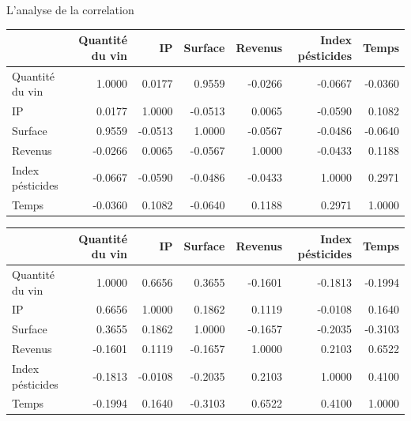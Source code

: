 \documentclass[11pt,ignorenonframetext,]{beamer}
\begin{document}
\begin{frame}{L'analyse de la correlation}
\protect\hypertarget{lanalyse-de-la-correlation}{}

\tiny

\normalsize

\tiny

\begin{longtable}[]{@{}lrrrrrr@{}}
\toprule
& Quantité du vin & IP & Surface & Revenus & Index pésticides &
Temps\tabularnewline
\midrule
\endhead
Quantité du vin & 1.0000 & 0.0177 & 0.9559 & -0.0266 & -0.0667 &
-0.0360\tabularnewline
IP & 0.0177 & 1.0000 & -0.0513 & 0.0065 & -0.0590 &
0.1082\tabularnewline
Surface & 0.9559 & -0.0513 & 1.0000 & -0.0567 & -0.0486 &
-0.0640\tabularnewline
Revenus & -0.0266 & 0.0065 & -0.0567 & 1.0000 & -0.0433 &
0.1188\tabularnewline
Index pésticides & -0.0667 & -0.0590 & -0.0486 & -0.0433 & 1.0000 &
0.2971\tabularnewline
Temps & -0.0360 & 0.1082 & -0.0640 & 0.1188 & 0.2971 &
1.0000\tabularnewline
\bottomrule
\end{longtable}

\normalsize

\tiny

\begin{longtable}[]{@{}lrrrrrr@{}}
\toprule
& Quantité du vin & IP & Surface & Revenus & Index pésticides &
Temps\tabularnewline
\midrule
\endhead
Quantité du vin & 1.0000 & 0.6656 & 0.3655 & -0.1601 & -0.1813 &
-0.1994\tabularnewline
IP & 0.6656 & 1.0000 & 0.1862 & 0.1119 & -0.0108 & 0.1640\tabularnewline
Surface & 0.3655 & 0.1862 & 1.0000 & -0.1657 & -0.2035 &
-0.3103\tabularnewline
Revenus & -0.1601 & 0.1119 & -0.1657 & 1.0000 & 0.2103 &
0.6522\tabularnewline
Index pésticides & -0.1813 & -0.0108 & -0.2035 & 0.2103 & 1.0000 &
0.4100\tabularnewline
Temps & -0.1994 & 0.1640 & -0.3103 & 0.6522 & 0.4100 &
1.0000\tabularnewline
\bottomrule
\end{longtable}

\normalsize

\end{frame}
\end{document}
